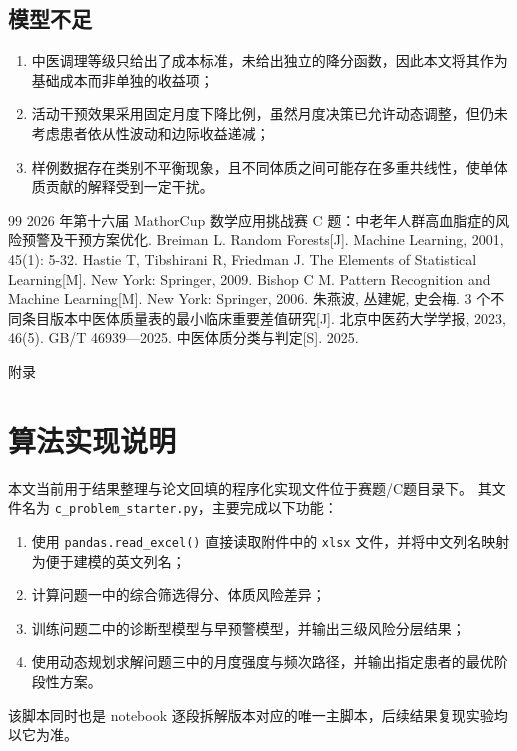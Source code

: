 \documentclass{MathorCupmodeling}
\begin{document}
	\subsection{模型不足}
		\begin{enumerate}
			\item 中医调理等级只给出了成本标准，未给出独立的降分函数，因此本文将其作为基础成本而非单独的收益项；
			\item 活动干预效果采用固定月度下降比例，虽然月度决策已允许动态调整，但仍未考虑患者依从性波动和边际收益递减；
			\item 样例数据存在类别不平衡现象，且不同体质之间可能存在多重共线性，使单体质贡献的解释受到一定干扰。
		\end{enumerate}
	
		\begin{thebibliography}{99}
			 2026 年第十六届 MathorCup 数学应用挑战赛 C 题：中老年人群高血脂症的风险预警及干预方案优化.
			 Breiman L. Random Forests[J]. Machine Learning, 2001, 45(1): 5-32.
			 Hastie T, Tibshirani R, Friedman J. The Elements of Statistical Learning[M]. New York: Springer, 2009.
			 Bishop C M. Pattern Recognition and Machine Learning[M]. New York: Springer, 2006.
			 朱燕波, 丛建妮, 史会梅. 3 个不同条目版本中医体质量表的最小临床重要差值研究[J]. 北京中医药大学学报, 2023, 46(5).
			 GB/T 46939---2025. 中医体质分类与判定[S]. 2025.
		\end{thebibliography}

	\newpage
	\appendix
	\begin{center}
		\heiti{} 附\hspace{1pc}录
	\end{center}

	\section{算法实现说明}
		本文当前用于结果整理与论文回填的程序化实现文件位于赛题/C题目录下。
		其文件名为 \texttt{c\_problem\_starter.py}，主要完成以下功能：
	\begin{enumerate}
		\item 使用 \texttt{pandas.read\_excel()} 直接读取附件中的 \texttt{xlsx} 文件，并将中文列名映射为便于建模的英文列名；
		\item 计算问题一中的综合筛选得分、体质风险差异；
		\item 训练问题二中的诊断型模型与早预警模型，并输出三级风险分层结果；
			\item 使用动态规划求解问题三中的月度强度与频次路径，并输出指定患者的最优阶段性方案。
	\end{enumerate}
		该脚本同时也是 notebook 逐段拆解版本对应的唯一主脚本，后续结果复现实验均以它为准。
\end{document}

